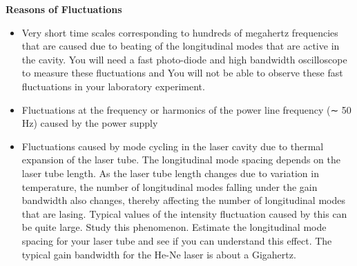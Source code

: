 \documentclass[11pt]{article}
\theoremstyle{definition}
\begin{document}
\textbf{Reasons of Fluctuations}
\begin{itemize}
\item Very short time scales corresponding to hundreds of megahertz frequencies that are caused due to beating of the longitudinal modes that are active in the cavity. You will need a fast photo-diode and high bandwidth oscilloscope to measure these fluctuations and You will not be able to observe these fast fluctuations in your laboratory experiment.
\item Fluctuations at the frequency or harmonics of the power line frequency (∼ 50 Hz) caused by the power supply
\item Fluctuations caused by mode cycling in the laser cavity due to thermal expansion of the laser tube. The longitudinal mode spacing depends on the laser tube length. As the laser tube length changes due to variation in temperature, the number of longitudinal modes falling under the gain bandwidth also changes, thereby affecting the number of longitudinal modes that are lasing. Typical values of the intensity fluctuation caused by this can be quite large. Study this phenomenon. Estimate the longitudinal mode spacing for your laser tube and see if you can understand this effect. The typical gain bandwidth for the He-Ne laser is about a Gigahertz.
\end{itemize}
\end{document}
